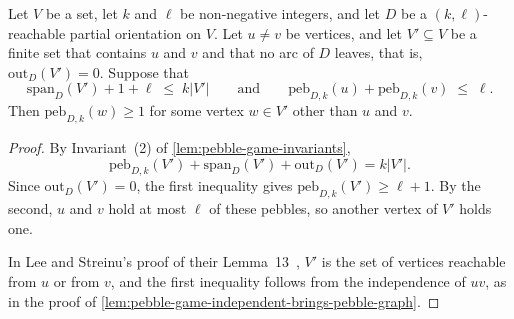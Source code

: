 \begin{lemma}
  \label{lem:pebble-game-independent-brings-pebble}
  \leanok
  Let $V$ be a set, let $k$ and $\ell$ be non-negative integers, and let
  $D$ be a $(k, \ell)$-reachable partial orientation on $V$. Let
  $u \ne v$ be vertices, and let $V' \subseteq V$ be a finite set that
  contains $u$ and $v$ and that no arc of $D$ leaves, that is,
  $\mathrm{out}_D(V') = 0$. Suppose that
  \[
    \mathrm{span}_D(V') + 1 + \ell \;\le\; k|V'|
    \qquad\text{and}\qquad
    \mathrm{peb}_{D, k}(u) + \mathrm{peb}_{D, k}(v) \;\le\; \ell.
  \]
  Then $\mathrm{peb}_{D, k}(w) \ge 1$ for some vertex $w \in V'$ other
  than $u$ and $v$.
\end{lemma}
\begin{proof}
  \leanok
  By Invariant~(2) of \cref{lem:pebble-game-invariants},
  \[
    \mathrm{peb}_{D, k}(V') + \mathrm{span}_D(V') + \mathrm{out}_D(V')
    = k|V'|.
  \]
  Since $\mathrm{out}_D(V') = 0$, the first inequality gives
  $\mathrm{peb}_{D, k}(V') \ge \ell + 1$. By the second, $u$ and $v$
  hold at most $\ell$ of these pebbles, so another vertex of $V'$ holds
  one.

  In Lee and Streinu's proof of their
  Lemma~13~\cite{leeStreinu2008}, $V'$ is the set of vertices reachable
  from $u$ or from $v$, and the first inequality follows from the
  independence of $uv$, as in the proof of
  \cref{lem:pebble-game-independent-brings-pebble-graph}.
\end{proof}

